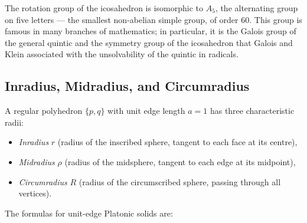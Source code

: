 The rotation group of the icosahedron is isomorphic to $A_5$, the alternating
group on five letters — the smallest non-abelian simple group, of order 60.
This group is famous in many branches of mathematics; in particular, it is the
Galois group of the general quintic and the symmetry group of the
icosahedron that Galois and Klein associated with the unsolvability of the
quintic in radicals.

\subsection{Inradius, Midradius, and Circumradius}
\label{sec:radii}

A regular polyhedron $\{p,q\}$ with unit edge length $a = 1$ has three
characteristic radii:
\begin{itemize}
  \item \emph{Inradius} $r$ (radius of the inscribed sphere, tangent to
        each face at its centre),
  \item \emph{Midradius} $\rho$ (radius of the midsphere, tangent to each
        edge at its midpoint),
  \item \emph{Circumradius} $R$ (radius of the circumscribed sphere, passing
        through all vertices).
\end{itemize}
The formulas for unit-edge Platonic solids are:

\begin{table}[ht]
\centering
\caption{Characteristic radii of the Platonic solids (edge length = 1).}
\label{tab:radii}
\end{table}


